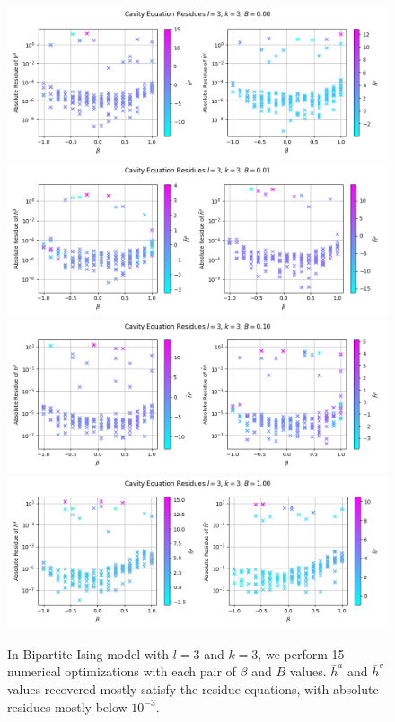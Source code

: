 \documentclass[12pt]{article}
\numberwithin{equation}{section}
\begin{document}
\begin{figure}[!h]
    \centering
    \includegraphics[width=12cm]{img/Ising_bptt/cavity_equation/l=3,k=3,B=0.0.png}
    \includegraphics[width=12cm]{img/Ising_bptt/cavity_equation/l=3,k=3,B=0.01.png}
    \includegraphics[width=12cm]{img/Ising_bptt/cavity_equation/l=3,k=3,B=0.1.png}
    \includegraphics[width=12cm]{img/Ising_bptt/cavity_equation/l=3,k=3,B=1.0.png}
    \caption{In Bipartite Ising model with $l=3$ and $k=3$, we perform 15 numerical optimizations with each pair of $\beta$ and $B$ values.
        $\bar{h}^a$ and $\bar{h}^v$ values recovered mostly satisfy the residue equations, with absolute residues mostly below $10^{-3}$.}
    \label{Fig.ISBP-CE-l3k3-2}
\end{figure}
\end{document}
